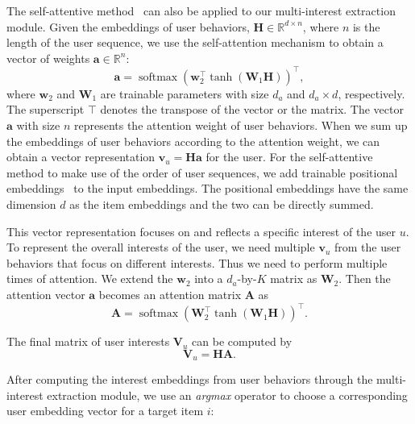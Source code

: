 The self-attentive method~\cite{lin2017structured} can also be applied to our multi-interest extraction module. 
Given the embeddings of user behaviors, $\mathbf{H}\in \mathbb{R}^{d\times n}$, where $n$ is the length of the user sequence, we use the self-attention mechanism to obtain a vector of weights $\mathbf{a} \in \mathbb{R}^{n}$:
\begin{equation}
    \mathbf{a} = \operatorname{softmax}(\mathbf{w}_{2}^\top \operatorname{tanh}(\mathbf{W}_{1} \mathbf{H}))^\top,
\end{equation}
\noindent where $\mathbf{w}_{2}$ and $\mathbf{W}_{1}$ are trainable parameters with size $d_a$ and $d_a \times d$, respectively. The superscript $\top$ denotes the transpose of the vector or the matrix. The vector $\mathbf{a}$ with size $n$ represents the attention weight of user behaviors. When we sum up the embeddings of user behaviors according to the attention weight, we can obtain a vector representation $\mathbf{v}_u = \mathbf{H} \mathbf{a}$ for the user. For the self-attentive method to make use of the order of user sequences, we add trainable positional embeddings~\cite{vaswani2017attention} to the input embeddings. The positional embeddings have the same dimension $d$ as the item embeddings and the two can be directly summed. 

This vector representation focuses on and reflects a specific interest of the user $u$. To represent the overall interests of the user, we need multiple $\mathbf{v}_u$ from the user behaviors that focus on different interests. Thus we need to perform multiple times of attention. We extend the $\mathbf{w}_{2}$ into a $d_a$-by-$K$ matrix as $\mathbf{W}_{2}$. Then the attention vector $\mathbf{a}$ becomes an attention matrix $\mathbf{A}$ as
\begin{equation}
    \mathbf{A} = \operatorname{softmax}(\mathbf{W}_{2}^\top \operatorname{tanh}(\mathbf{W}_{1} \mathbf{H}))^\top.
\end{equation}

The final matrix of user interests $\mathbf{V}_u$ can be computed by
\begin{equation}
    \label{eqn:sa}
    \mathbf{V}_u = \mathbf{H} \mathbf{A}.
\end{equation}



After computing the interest embeddings from user behaviors through the multi-interest extraction module, we use an \textit{argmax} operator to choose a corresponding user embedding vector for a target item $i$:

